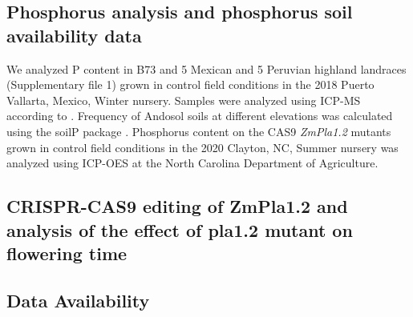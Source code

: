 \documentclass[9pt,twocolumn,twoside,lineno]{gsajnl}
\begin{document}
\subsection{Phosphorus analysis and phosphorus soil availability data}
We analyzed P content in B73 and 5 Mexican  and 5 Peruvian highland landraces (Supplementary file 1) grown in control field conditions in the 2018 Puerto Vallarta, Mexico, Winter nursery. Samples were analyzed using ICP-MS according to \cite{Baxter2014-ch}. 
Frequency of Andosol soils at different elevations was calculated using the soilP package \cite{Rodriguez-Zapata2018-vz}.
Phosphorus content on the CAS9 \textit{ZmPla1.2} mutants grown in control field conditions in the 2020 Clayton, NC, Summer nursery was analyzed using ICP-OES at the North Carolina Department of Agriculture.   

\subsection{CRISPR-CAS9 editing of ZmPla1.2 and analysis of the effect of pla1.2 mutant on flowering time}

\subsection{Data Availability}
\end{document}

